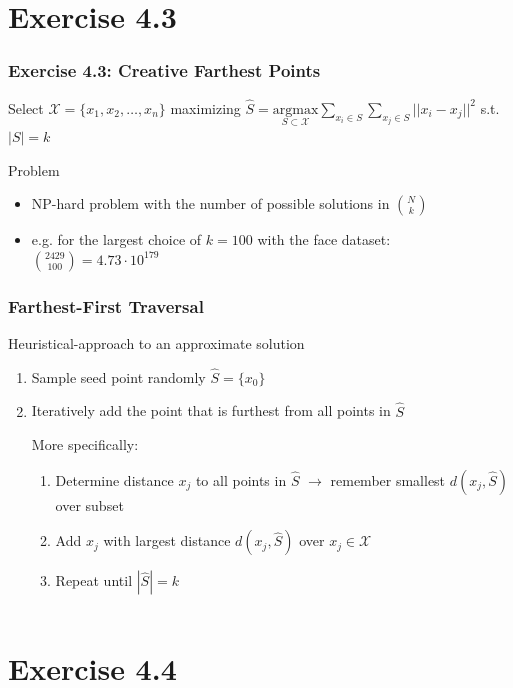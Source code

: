 \documentclass[10pt,aspectratio=169,handout]{beamer}
\begin{document}
\section{Exercise 4.3}

\begin{frame}
    \frametitle{Exercise 4.3: Creative Farthest Points}

    Select $\mathcal{X} = \{x_1, x_2, \dots, x_n \}$ maximizing $\hat{S} = \underset{S \subset \mathcal{X}}{\mathrm{argmax}}  \underset{x_i \in S}\sum \underset{x_j \in S}\sum || x_i - x_j||^2$ s.t. $|S| = k$

    Problem
    \begin{itemize}
        \item NP-hard problem with the number of possible solutions in ${N\choose k}$
        \item e.g. for the largest choice of $k=100$ with the face dataset: ${2429\choose 100} = 4.73 \cdot 10^{179}$ 
    \end{itemize}
\end{frame}

\begin{frame}
    \frametitle{Farthest-First Traversal}
    Heuristical-approach to an approximate solution
    \begin{enumerate}
        \item Sample seed point randomly $\hat{S} = \{ x_0 \}$
        \item Iteratively add the point that is furthest from all points in $\hat{S}$

        More specifically: 
        \begin{enumerate}
            \item Determine distance $x_j$ to all points in $\hat{S}$ $\rightarrow$ remember smallest $d(x_j, \hat{S})$ over subset
            \item Add $x_j$ with largest distance $d(x_j, \hat{S})$ over $x_j  \in \mathcal{X}$
            \item Repeat until $|\hat{S}| = k$
        \end{enumerate}
    \end{enumerate}
\end{frame}

\begin{frame}
    \inputminted[bgcolor=LightGray,fontsize=\small]{python}{code/farthest-first.py}
\end{frame}


\section{Exercise 4.4}
\end{document}
